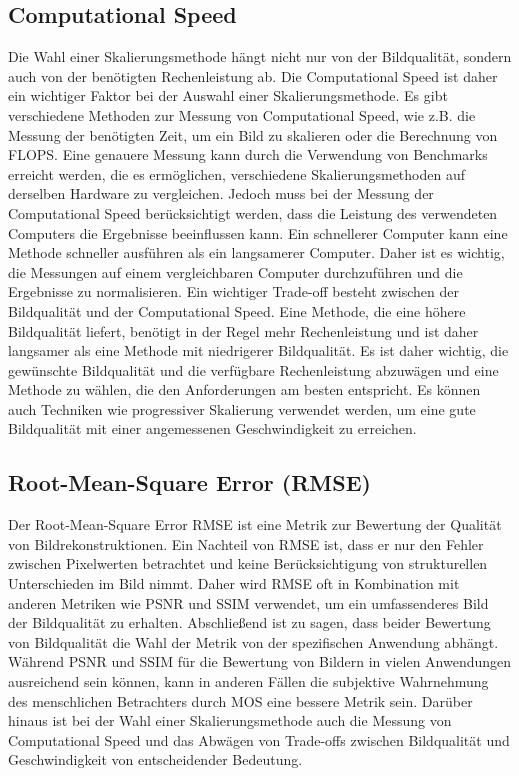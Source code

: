     \subsection{Computational Speed}
    
        Die Wahl einer Skalierungsmethode hängt nicht nur von der Bildqualität, sondern auch von der benötigten Rechenleistung ab. 
        Die Computational Speed ist daher ein wichtiger Faktor bei der Auswahl einer Skalierungsmethode.
        Es gibt verschiedene Methoden zur Messung von Computational Speed, wie z.B. die Messung der benötigten Zeit, um ein Bild zu skalieren oder die Berechnung von \ac{FLOPS}. 
        Eine genauere Messung kann durch die Verwendung von Benchmarks erreicht werden, die es ermöglichen, verschiedene Skalierungsmethoden auf derselben Hardware zu vergleichen.
        Jedoch muss bei der Messung der Computational Speed berücksichtigt werden, dass die Leistung des verwendeten Computers die Ergebnisse beeinflussen kann. 
        Ein schnellerer Computer kann eine Methode schneller ausführen als ein langsamerer Computer. 
        Daher ist es wichtig, die Messungen auf einem vergleichbaren Computer durchzuführen und die Ergebnisse zu normalisieren.
        Ein wichtiger Trade-off besteht zwischen der Bildqualität und der Computational Speed. 
        Eine Methode, die eine höhere Bildqualität liefert, benötigt in der Regel mehr Rechenleistung und ist daher langsamer als eine Methode mit niedrigerer Bildqualität. 
        Es ist daher wichtig, die gewünschte Bildqualität und die verfügbare Rechenleistung abzuwägen und eine Methode zu wählen, die den Anforderungen am besten entspricht. 
        Es können auch Techniken wie progressiver Skalierung verwendet werden, um eine gute Bildqualität mit einer angemessenen Geschwindigkeit zu erreichen.
        
    \subsection{Root-Mean-Square Error (RMSE)}
    
        Der Root-Mean-Square Error \ac{RMSE} ist eine Metrik zur Bewertung der Qualität von Bildrekonstruktionen. 
        Ein Nachteil von RMSE ist, dass er nur den Fehler zwischen Pixelwerten betrachtet und keine Berücksichtigung von strukturellen Unterschieden im Bild nimmt. 
        Daher wird RMSE oft in Kombination mit anderen Metriken wie PSNR und SSIM verwendet, um ein umfassenderes Bild der Bildqualität zu erhalten.
        Abschließend ist zu sagen, dass beider Bewertung von Bildqualität die Wahl der Metrik von der spezifischen Anwendung abhängt. 
        Während PSNR und SSIM für die Bewertung von Bildern in vielen Anwendungen ausreichend sein können, kann in anderen Fällen die subjektive Wahrnehmung des menschlichen Betrachters durch MOS eine bessere Metrik sein. 
        Darüber hinaus ist bei der Wahl einer Skalierungsmethode auch die Messung von Computational Speed und das Abwägen von Trade-offs zwischen Bildqualität und Geschwindigkeit von entscheidender Bedeutung.
        
